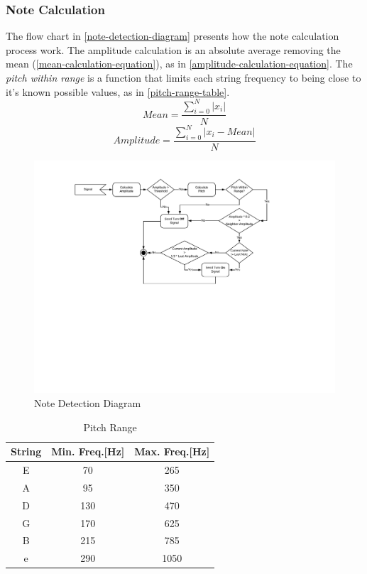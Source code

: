 \subsubsection{Note Calculation}
The flow chart in \autoref{note-detection-diagram} presents how the note calculation
process work. The amplitude calculation is an absolute average removing the mean (\autoref{mean-calculation-equation}), as in
\autoref{amplitude-calculation-equation}. The \textit{pitch within range} is a function that limits
each string frequency to being close to it's known possible values, as in \autoref{pitch-range-table}.
\begin{equation}
  \label{mean-calculation-equation}
  Mean = \frac{\sum_{i=0}^{N}{\left | x_{i} \right |}}{N}
\end{equation}
\begin{equation}
	\label{amplitude-calculation-equation}
	Amplitude = \frac{\sum_{i=0}^{N}{\left | x_{i} - Mean \right |}}{N}
\end{equation}	
\begin{figure}[htb]
	\caption{Note Detection Diagram}
	\label{note-detection-diagram}
	\begin{center}
		\includegraphics[width=0.7\paperwidth]{images/note-detection-flow-diagram}
	\end{center}
\end{figure}

\begin{table}[htb]
  \ABNTEXreducedfont
  \caption[Pitch Range]{Pitch Range}
  \label{pitch-range-table}
  \centering
  \begin{tabular}{c|c|c}
    \textbf{String} & \textbf{Min. Freq.[Hz]} & \textbf{Max. Freq.[Hz]} \\
		\hline \hline
		E & 70 & 265 \\
		\hline
		A & 95 & 350 \\
		\hline
		D & 130 & 470 \\
		\hline
		G & 170 & 625 \\
		\hline
		B & 215 & 785 \\
		\hline
		e & 290 & 1050 \\
  \end{tabular}
\end{table}

